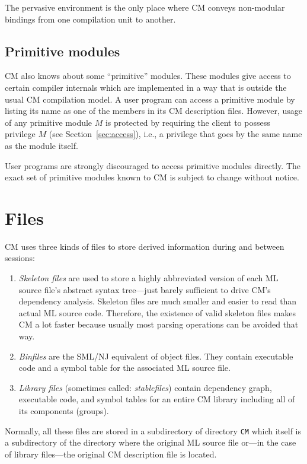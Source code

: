 \documentclass{article}
\begin{document}
The pervasive environment is the only place where CM conveys
non-modular bindings from one compilation unit to another.

\subsection{Primitive modules}

CM also knows about some ``primitive'' modules.  These modules give
access to certain compiler internals which are implemented in a way
that is outside the usual CM compilation model.  A user program can
access a primitive module by listing its name as one of the members in
its CM description files.  However, usage of any primitive module $M$
is protected by requiring the client to possess  privilege $M$
(see Section~\ref{sec:access}), i.e., a privilege that goes by the
same name as the module itself.

User programs are strongly discouraged to access primitive modules
directly. The exact set of primitive modules known to CM is subject to
change without notice.

\section{Files}

CM uses three kinds of files to store derived information during and
between sessions:

\begin{enumerate}
\item {\it Skeleton files} are used to store a highly abbreviated
version of each ML source file's abstract syntax tree---just barely
sufficient to drive CM's dependency analysis.  Skeleton files are much
smaller and easier to read than actual ML source code.  Therefore, the
existence of valid skeleton files makes CM a lot faster because
usually most parsing operations can be avoided that way.
\item {\it Binfiles} are the SML/NJ equivalent of object files.  They
contain executable code and a symbol table for the associated ML
source file.
\item {\it Library files} (sometimes called: {\em stablefiles}) contain
dependency graph, executable code, and symbol tables for an entire CM
library including all of its components (groups).
\end{enumerate}

Normally, all these files are stored in a subdirectory of directory
{\tt CM} which itself is a subdirectory of the directory where the
original ML source file or---in the case of library files---the
original CM description file is located.
\end{document}
